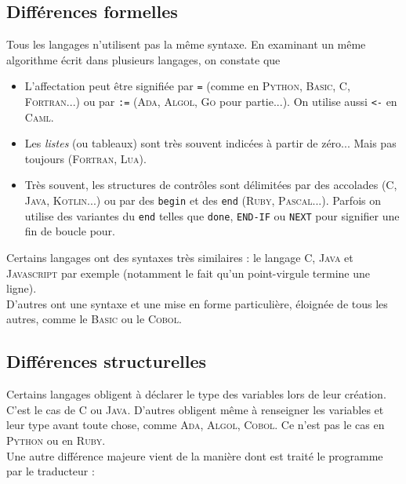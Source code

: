 \subsection{Différences formelles}

Tous les langages n'utilisent pas la même syntaxe. En examinant un même algorithme écrit dans plusieurs langages, on constate que 

\begin{itemize}
    \item   L'affectation peut être signifiée par \texttt{=} (comme en \textsc{Python}, \textsc{Basic}, \textsc{C}, \textsc{Fortran}...) ou par \texttt{:=} (\textsc{Ada}, \textsc{Algol}, \textsc{Go} pour partie...). On utilise aussi \texttt{<-} en \textsc{Caml}.
    \item   Les \textit{listes} (ou tableaux) sont très souvent indicées à partir de zéro... Mais pas toujours (\textsc{Fortran}, \textsc{Lua}).
    \item   Très souvent, les structures de contrôles sont délimitées par des accolades (\textsc{C}, \textsc{Java},  \textsc{Kotlin}...) ou par des \texttt{begin} et des \texttt{end} (\textsc{Ruby}, \textsc{Pascal}...). Parfois on utilise des variantes du \texttt{end} telles que \texttt{done}, \texttt{END-IF} ou \texttt{NEXT} pour signifier une fin de boucle \og pour\fg{}.
\end{itemize}

Certains langages ont des syntaxes très similaires : le langage \textsc{C}, \textsc{Java} et \textsc{Javascript} par exemple (notamment le fait qu'un point-virgule termine une ligne).\\
D'autres ont une syntaxe et une mise en forme particulière, éloignée de tous les autres, comme le \textsc{Basic} ou le \textsc{Cobol}.

\subsection{Différences structurelles}

Certains langages obligent à déclarer le type des variables lors de leur création. C'est le cas de \textsc{C} ou \textsc{Java}. D'autres obligent même à renseigner les variables et leur type avant toute chose, comme \textsc{Ada}, \textsc{Algol}, \textsc{Cobol}. Ce n'est pas le cas en \textsc{Python} ou en \textsc{Ruby}.\\

Une autre différence majeure vient de la manière dont est traité le programme par le traducteur :

